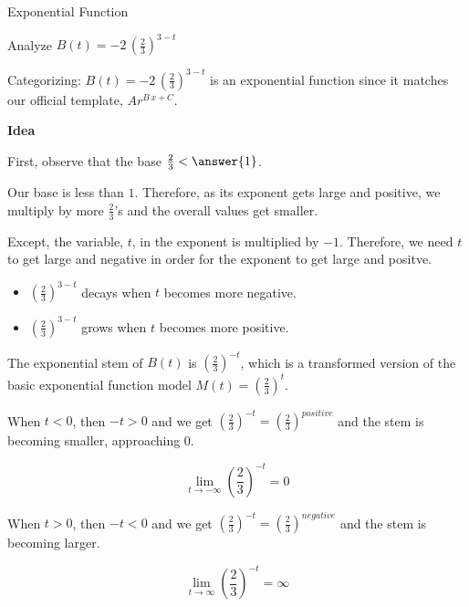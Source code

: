 \documentclass{ximera}
\begin{document}
\begin{example}  Exponential Function



Analyze   $B(t) = -2 \, \left( \frac{2}{3} \right)^{3-t}$ 





Categorizing: $B(t) = -2 \, \left( \frac{2}{3} \right)^{3-t}$ is an exponential function since it matches our official template, $A r^{B \, x + C}$. 


\textbf{\textcolor{blue!55!black}{Idea}} 


First, observe that the base $\frac{2}{3} < \answer{1}$.


Our base is less than $1$.  Therefore, as its exponent gets large and positive, we multiply by more $\frac{2}{3}$'s and the overall values get smaller.


Except, the variable, $t$, in the exponent is multiplied by $-1$.  Therefore, we need $t$ to get large and negative in order for the exponent to get large and positve.


\begin{itemize}
\item $\left( \frac{2}{3} \right)^{3-t}$ decays when $t$ becomes more negative.
\item $\left( \frac{2}{3} \right)^{3-t}$ grows when $t$ becomes more positive.
\end{itemize}








The exponential stem of $B(t)$ is $\left( \frac{2}{3} \right)^{-t}$, which is a transformed version of the basic exponential function model $M(t) = \left( \frac{2}{3} \right)^{t}$.  



When $t < 0$, then $-t > 0$ and we get  $\left( \frac{2}{3} \right)^{-t} = \left( \frac{2}{3} \right)^{positive}$ and the stem is becoming smaller, approaching $0$.  





\[ \lim\limits_{t \to -\infty} \left( \frac{2}{3} \right)^{-t} = 0 \]



When $t > 0$, then $-t < 0$ and we get  $\left( \frac{2}{3} \right)^{-t} = \left( \frac{2}{3} \right)^{negative}$ and the stem is becoming larger.  



\[ \lim\limits_{t \to \infty} \left( \frac{2}{3} \right)^{-t} = \infty \]














\end{example}
\end{document}
